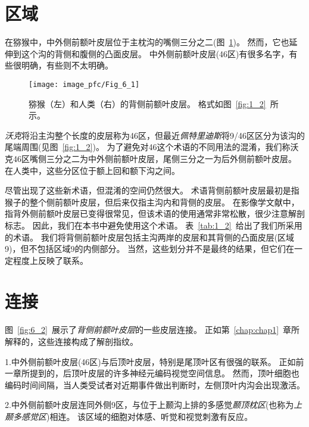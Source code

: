 \section{区域}

在猕猴中，中外侧前额叶皮层位于主枕沟的嘴侧三分之二(图~\ref{fig:6_1})。
然而，它也延伸到这个沟的背侧和腹侧的凸面皮层。
中外侧前额叶皮层(46区)有很多名字，有些很明确，有些则不太明确。


\begin{figure}
	\centering
	\texttt{[image: image\_pfc/Fig\_6\_1]}
	\caption{猕猴（左）和人类（右）的背侧前额叶皮层。
		格式如图~\ref{fig:1_2}~所示。}
	\label{fig:6_1}
\end{figure}


\textit{沃克}将沿主沟整个长度的皮层称为46区\cite{walker1940cytoarchitectural}，但最近\textit{佩特里迪斯}将9/46区区分为该沟的尾端周围(见图~\ref{fig:1_2})\cite{petrides1999dorsolateral}。
为了避免对46这个术语的不同用法的混淆，我们称沃克46区嘴侧三分之二为中外侧前额叶皮层，尾侧三分之一为后外侧前额叶皮层。
在人类中，这些分区位于额上回和额下沟之间。


尽管出现了这些新术语，但混淆的空间仍然很大。
术语背侧前额叶皮层最初是指猴子的整个侧前额叶皮层\cite{pribram1952effects}，但后来仅指主沟内和背侧的皮层\cite{mishkin1969re}。
在影像学文献中，指背外侧前额叶皮层已变得很常见，但该术语的使用通常非常松散，很少注意解剖标志。
因此，我们在本书中避免使用这个术语。
表~\ref{tab:1_2}~给出了我们所采用的术语。
我们将背侧前额叶皮层包括主沟两岸的皮层和其背侧的凸面皮层(区域9)，但不包括区域9的内侧部分。
当然，这些划分并不是最终的结果，但它们在一定程度上反映了联系。



\section{连接}

图~\ref{fig:6_2}~展示了\textit{背侧前额叶皮层}的一些皮层连接。
正如第~\ref{chap:chap1}~章所解释的，这些连接构成了解剖指纹。
\par


1.中外侧前额叶皮层(46区)与后顶叶皮层，特别是尾顶叶区有很强的联系\cite{petrides1984projections}。
正如前一章所提到的，后顶叶皮层的许多神经元编码视觉空间信息。
然而，顶叶细胞也编码时间间隔\cite{leon2003representation}，当人类受试者对近期事件做出判断时，左侧顶叶内沟会出现激活\cite{dudukovic2007goal}。
\par


2.中外侧前额叶皮层连同外侧9区，与位于上颞沟上排的多感觉\textit{颞顶枕区}(也称为\textit{上颞多感觉区})相连\cite{seltzer1996overlapping}。
该区域的细胞对体感、听觉和视觉刺激有反应\cite{bruce1981visual}。
\par


